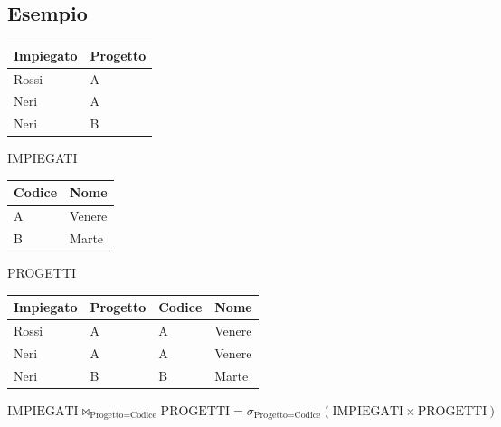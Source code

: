 \subsection{Esempio}
\begin{center}

    \begin{minipage}{0.3\textwidth}
        \centering
        
        \begin{tabular}{|l|l|}
        \hline
        \textbf{Impiegato} & \textbf{Progetto} \\ \hline
        Rossi & A \\ \hline
        Neri & A \\ \hline
        Neri & B \\ \hline
        \end{tabular}
        
        \vspace{2mm}
        \small IMPIEGATI
        
        \vspace{1cm} %
        
        \begin{tabular}{|l|l|}
        \hline
        \textbf{Codice} & \textbf{Nome} \\ \hline
        A & Venere \\ \hline
        B & Marte \\ \hline
        \end{tabular}
        
        \vspace{2mm}
        \small PROGETTI
        
    \end{minipage}%
    \hfill
    \begin{minipage}{0.65\textwidth}
        \centering
        
        \begin{tabular}{|l|l|l|l|}
        \hline
        \textbf{Impiegato} & \textbf{Progetto} & \textbf{Codice} & \textbf{Nome} \\ \hline
        Rossi & A & A & Venere \\ \hline
        Neri & A & A & Venere \\ \hline
        Neri & B & B & Marte \\ \hline
        \end{tabular}
        
        \vspace{3mm}
        
        \footnotesize %
        $\text{IMPIEGATI} \bowtie_{\text{Progetto}=\text{Codice}} \text{PROGETTI} = \sigma_{\text{Progetto}=\text{Codice}}(\text{IMPIEGATI} \times \text{PROGETTI})$
        
    \end{minipage}

\end{center}

